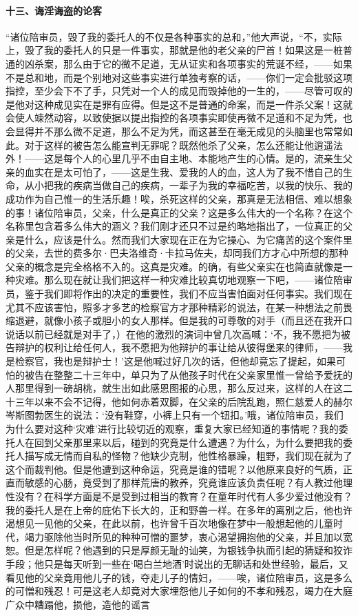 \paragraph*{十三、诲淫诲盗的论客}
\par “诸位陪审员，毁了我的委托人的不仅是各种事实的总和，”他大声说，“不，实际上，毁了我的委托人的只是一件事实，那就是他的老父亲的尸首！如果这是一桩普通的凶杀案，那么由于它的微不足道，无从证实和各项事实的荒诞不经，——如果不是总和地，而是个别地对这些事实进行单独考察的话，——你们一定会批驳这项指控，至少会下不了手，只凭对一个人的成见而毁掉他的一生的，——尽管可叹的是他对这种成见实在是罪有应得。但是这不是普通的命案，而是一件杀父案！这就会使人竦然动容，以致使据以提出指控的各项事实即使再微不足道和不足为凭，也会显得并不那么微不足道，那么不足为凭，而这甚至在毫无成见的头脑里也常常如此。对于这样的被告怎么能宣判无罪呢？既然他杀了父亲，怎么还能让他逍遥法外！——这是每个人的心里几乎不由自主地、本能地产生的心情。是的，流亲生父亲的血实在是太可怕了，——这是生我、爱我的人的血，这人为了我不惜自己的生命，从小把我的疾病当做自己的疾病，一辈子为我的幸福吃苦，以我的快乐、我的成功作为自己惟一的生活乐趣！唉，杀死这样的父亲，那真是无法相信、难以想象的事！诸位陪审员，父亲，什么是真正的父亲？这是多么伟大的一个名称？在这个名称里包含着多么伟大的涵义？我们刚才还只不过是约略地指出了，一位真正的父亲是什么，应该是什么。然而我们大家现在正在为它操心、为它痛苦的这个案件里的父亲，去世的费多尔·巴夫洛维奇·卡拉马佐夫，却同我们方才心中所想的那种父亲的概念是完全格格不入的。这真是灾难。的确，有些父亲实在也简直就像是一种灾难。那么现在就让我们把这样一种灾难比较真切地观察一下吧，——诸位陪审员，鉴于我们即将作出的决定的重要性，我们不应当害怕面对任何事实。我们现在尤其不应该害怕，照多才多艺的检察官方才那种精彩的说法，在某一种想法之前畏缩退避，就像小孩子或胆小的女人那样。但是我的可尊敬的对手（而且还在我开口说话以前已经就是对手了，）在他的激烈的演词中曾几次高喊：‘不，我不愿把为被告辩护的权利让给任何人，我不愿把为他辩护的事让给从彼得堡来的律师，——我是检察官，我也是辩护士！’这是他喊过好几次的话，但他却竟忘了提起，如果可怕的被告在整整二十三年中，单只为了从他孩子时代在父亲家里惟一曾给予爱抚的人那里得到一磅胡桃，就生出如此感恩图报的心思，那么反过来，这样的人在这二十三年以来不会不记得，他如何赤着双脚，在父亲的后院乱跑，照仁慈爱人的赫尔岑斯图勃医生的说法：‘没有鞋穿，小裤上只有一个钮扣。’哦，诸位陪审员，我们为什么要对这种‘灾难’进行比较切近的观察，重复大家已经知道的事情呢？我的委托人在回到父亲那里来以后，碰到的究竟是什么遭遇？为什么，为什么要把我的委托人描写成无情而自私的怪物？他缺少克制，他性格暴躁，粗野，我们现在就为了这个而裁判他。但是他遭到这种命运，究竟是谁的错呢？以他原来良好的气质，正直而敏感的心肠，竟受到了那样荒唐的教养，究竟谁应该负责任呢？有人教过他理性没有？在科学方面是不是受到过相当的教育？在童年时代有人多少爱过他没有？我的委托人是在上帝的庇佑下长大的，正和野兽一样。在多年的离别之后，他也许渴想见一见他的父亲，在此以前，也许曾千百次地像在梦中一般想起他的儿童时代，竭力驱除他当时所见的种种可憎的噩梦，衷心渴望拥抱他的父亲，并且加以宽恕。但是怎样呢？他遇到的只是厚颜无耻的讪笑，为银钱争执而引起的猜疑和狡诈手段；他只是每天听到一些在‘喝白兰地酒’时说出的无聊话和处世经验，最后，又看见他的父亲竟用他儿子的钱，夺走儿子的情妇，——唉，诸位陪审员，这是多么的可憎和残忍！可是这老人却竟对大家埋怨他儿子如何的不孝和残忍，竭力在大庭广众中糟蹋他，损他，造他的谣言